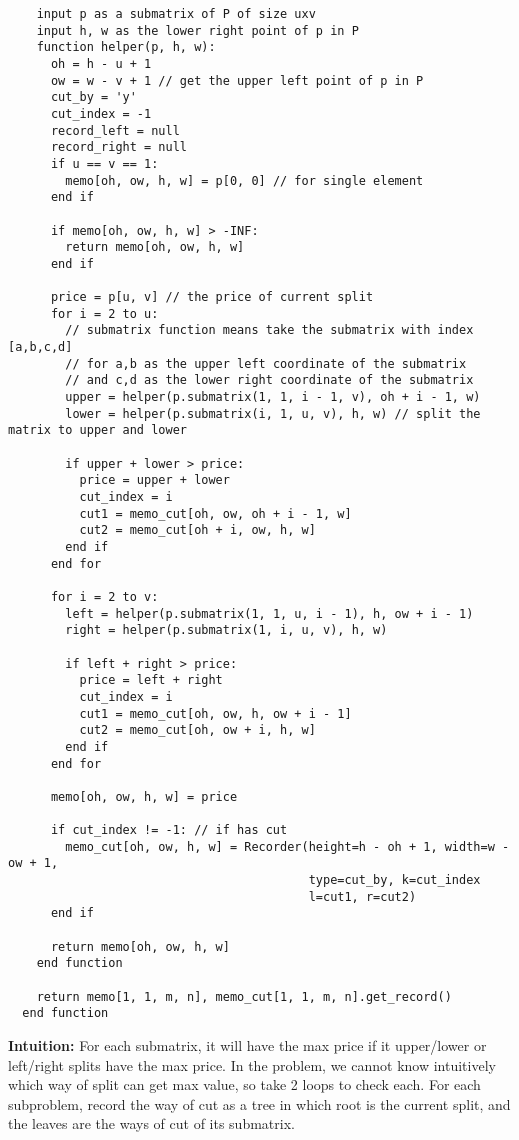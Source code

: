 \documentclass{article}
\newcounter{problem}
\begin{document}
\begin{enumerate}[topsep=0pt]
\begin{verbatim}
    input p as a submatrix of P of size uxv
    input h, w as the lower right point of p in P
    function helper(p, h, w):
      oh = h - u + 1
      ow = w - v + 1 // get the upper left point of p in P
      cut_by = 'y'
      cut_index = -1
      record_left = null
      record_right = null
      if u == v == 1:
        memo[oh, ow, h, w] = p[0, 0] // for single element
      end if

      if memo[oh, ow, h, w] > -INF:
        return memo[oh, ow, h, w]
      end if

      price = p[u, v] // the price of current split
      for i = 2 to u:
        // submatrix function means take the submatrix with index [a,b,c,d]
        // for a,b as the upper left coordinate of the submatrix
        // and c,d as the lower right coordinate of the submatrix
        upper = helper(p.submatrix(1, 1, i - 1, v), oh + i - 1, w)
        lower = helper(p.submatrix(i, 1, u, v), h, w) // split the matrix to upper and lower

        if upper + lower > price:
          price = upper + lower
          cut_index = i
          cut1 = memo_cut[oh, ow, oh + i - 1, w]
          cut2 = memo_cut[oh + i, ow, h, w]
        end if
      end for

      for i = 2 to v:
        left = helper(p.submatrix(1, 1, u, i - 1), h, ow + i - 1)
        right = helper(p.submatrix(1, i, u, v), h, w)

        if left + right > price:
          price = left + right
          cut_index = i
          cut1 = memo_cut[oh, ow, h, ow + i - 1]
          cut2 = memo_cut[oh, ow + i, h, w]
        end if
      end for

      memo[oh, ow, h, w] = price

      if cut_index != -1: // if has cut
        memo_cut[oh, ow, h, w] = Recorder(height=h - oh + 1, width=w - ow + 1, 
                                          type=cut_by, k=cut_index
                                          l=cut1, r=cut2)
      end if

      return memo[oh, ow, h, w]
    end function

    return memo[1, 1, m, n], memo_cut[1, 1, m, n].get_record()
  end function
\end{verbatim}

\textbf{Intuition:}
For each submatrix, it will have the max price if it upper/lower or left/right splits have the max price.
In the problem, we cannot know intuitively which way of split can get max value, so take 2 loops to check each.
For each subproblem, record the way of cut as a tree in which root is the current split, 
and the leaves are the ways of cut of its submatrix.


\end{enumerate}
\end{document}
